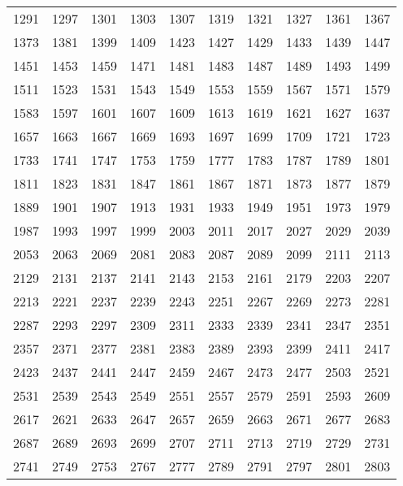 \begin{center}
\begin{tabular}{llllllllll}
1291 &1297 &1301 &1303 &1307 &1319 &1321 &1327 &1361 &1367 \\
1373 &1381 &1399 &1409 &1423 &1427 &1429 &1433 &1439 &1447 \\
1451 &1453 &1459 &1471 &1481 &1483 &1487 &1489 &1493 &1499 \\
1511 &1523 &1531 &1543 &1549 &1553 &1559 &1567 &1571 &1579 \\
1583 &1597 &1601 &1607 &1609 &1613 &1619 &1621 &1627 &1637 \\
1657 &1663 &1667 &1669 &1693 &1697 &1699 &1709 &1721 &1723 \\
1733 &1741 &1747 &1753 &1759 &1777 &1783 &1787 &1789 &1801 \\
1811 &1823 &1831 &1847 &1861 &1867 &1871 &1873 &1877 &1879 \\
1889 &1901 &1907 &1913 &1931 &1933 &1949 &1951 &1973 &1979 \\
1987 &1993 &1997 &1999 &2003 &2011 &2017 &2027 &2029 &2039 \\
2053 &2063 &2069 &2081 &2083 &2087 &2089 &2099 &2111 &2113 \\
2129 &2131 &2137 &2141 &2143 &2153 &2161 &2179 &2203 &2207 \\
2213 &2221 &2237 &2239 &2243 &2251 &2267 &2269 &2273 &2281 \\
2287 &2293 &2297 &2309 &2311 &2333 &2339 &2341 &2347 &2351 \\
2357 &2371 &2377 &2381 &2383 &2389 &2393 &2399 &2411 &2417 \\
2423 &2437 &2441 &2447 &2459 &2467 &2473 &2477 &2503 &2521 \\
2531 &2539 &2543 &2549 &2551 &2557 &2579 &2591 &2593 &2609 \\
2617 &2621 &2633 &2647 &2657 &2659 &2663 &2671 &2677 &2683 \\
2687 &2689 &2693 &2699 &2707 &2711 &2713 &2719 &2729 &2731 \\
2741 &2749 &2753 &2767 &2777 &2789 &2791 &2797 &2801 &2803 \\
\end{tabular}
\end{center}
